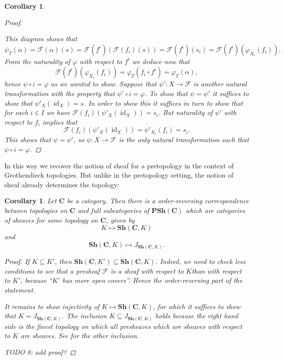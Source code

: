 \documentclass[12pt,reqno,a4paper]{amsart}
\theoremstyle{plain}
\newtheorem{cor}[thm]{Corollary}
\theoremstyle{definition}
\theoremstyle{remark}
\begin{document}
\begin{cor}
\begin{proof}
\begin{center}
    \end{center}
    This diagram shows that
    \[ \psi_{T}(\alpha) = \mathscr{F}(\alpha)(s) = \mathscr{F}(f^{i})(\mathscr{F}(f_{i})(s)) = \mathscr{F}(f^{i})(s_{i}) = \mathscr{F}(f^{i})(\varphi_{X_{i}}(f_{i})). \]
    From the naturality of $\varphi$ with respect to $f^{i}$ we deduce now that
    \[ \mathscr{F}(f^{i})(\varphi_{X_{i}}(f_{i})) = \varphi_{T}(f_{i} \circ f^{i}) = \varphi_{T}(\alpha), \]
    hence $\psi \circ i = \varphi$ as we wanted to show.
    Suppose that $\psi' \colon X \to \mathscr{F}$ is another natural transformation with the property that $\psi' \circ i = \varphi$.
    To show that $\psi = \psi'$ it suffices to show that $\psi'_{X}(\operatorname{id}_{X}) = s$.
    In order to show this it suffices in turn to show that for each $i \in I$ we have $\mathscr{F}(f_{i})(\psi'_{X}(\operatorname{id}_{X})) = s_{i}$.
    But naturality of $\psi'$ with respect to $f_{i}$ implies that
    \[ \mathscr{F}(f_{i})(\psi'_{X}(\operatorname{id}_{X})) = \psi'_{X_{i}}(f_{i}) = s_{i}. \]
    This shows that $\psi = \psi'$, so $\psi \colon X \to \mathscr{F}$ is the only natural transformation such that $\psi \circ i = \varphi$.
  \end{proof}
\end{cor}

In this way we recover the notion of sheaf for a pretopology in the context of Grothendieck topologies.
But unlike in the pretopology setting, the notion of sheaf already determines the topology:

\begin{cor}\label{cor:correspondence}
  Let $\mathbf{C}$ be a category.
  Then there is a order-reversing correspondence between topologies on $\mathbf{C}$ and full subcategories of $\mathbf{PSh}(\mathbf{C})$ which are categories of sheaves for some topology on $\mathbf{C}$, given by
  \[ K \mapsto \mathbf{Sh}(\mathbf{C},K) \]
  and
  \[ \mathbf{Sh}(\mathbf{C},K) \mapsto J_{\mathbf{Sh}(\mathbf{C},K)}. \]
  \begin{proof}
    If $K \subseteq K'$, then $\mathbf{Sh}(\mathbf{C},K') \subseteq \mathbf{Sh}(\mathbf{C},K)$.
    Indeed, we need to check less conditions to see that a presheaf $\mathscr{F}$ is a sheaf with respect to $K$than with respect to $K'$, because ``$K'$ has more open covers''.
    Hence the order-reversing part of the statement.

    It remains to show injectivity of $K \mapsto \mathbf{Sh}(\mathbf{C},K)$, for which it suffices to show that $K = J_{\mathbf{Sh}(\mathbf{C},K)}$.
    The inclusion $K \subseteq J_{\mathbf{Sh}(\mathbf{C},K)}$ holds because the right hand side is the finest topology on which all presheaves which are sheaves with respect to $K$ are sheaves.
    See \cite[\href{https://stacks.math.columbia.edu/tag/00ZP}{Tag 00ZP}]{stacks-project} for the other inclusion.

    {\color{red} TODO 8: add proof?}
  \end{proof}
\end{cor}
\end{document}
